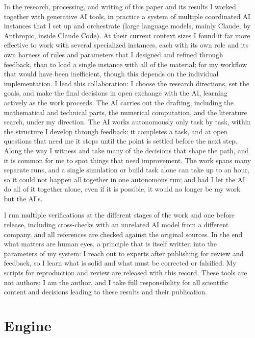 \documentclass[aps,prx,reprint,amsmath,amssymb,floatfix,nofootinbib,superscriptaddress]{revtex4-2}
\begin{document}
In the research, processing, and writing of this paper and its results I worked together with generative AI tools, in practice a system of multiple coordinated AI instances that I set up and orchestrate (large language models, mainly Claude, by Anthropic, inside Claude Code). At their current context sizes I found it far more effective to work with several specialized instances, each with its own role and its own harness of rules and parameters that I designed and refined through feedback, than to load a single instance with all of the material; for my workflow that would have been inefficient, though this depends on the individual implementation. I lead this collaboration: I choose the research directions, set the goals, and make the final decisions in open exchange with the AI, learning actively as the work proceeds. The AI carries out the drafting, including the mathematical and technical parts, the numerical computation, and the literature search, under my direction. The AI works autonomously only task by task, within the structure I develop through feedback: it completes a task, and at open questions that need me it stops until the point is settled before the next step. Along the way I witness and take many of the decisions that shape the path, and it is common for me to spot things that need improvement. The work spans many separate runs, and a single simulation or build task alone can take up to an hour, so it could not happen all together in one autonomous run; and had I let the AI do all of it together alone, even if it is possible, it would no longer be my work but the AI's.

I run multiple verifications at the different stages of the work and one before release, including cross-checks with an unrelated AI model from a different company, and all references are checked against the original sources. In the end what matters are human eyes, a principle that is itself written into the parameters of my system: I reach out to experts after publishing for review and feedback, so I learn what is solid and what must be corrected or falsified. My scripts for reproduction and review are released with this record. These tools are not authors; I am the author, and I take full responsibility for all scientific content and decisions leading to these results and their publication.

\appendix

\section{Engine}
\label{app:engine}
\end{document}
